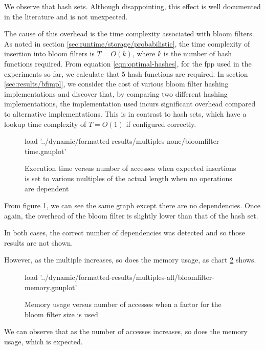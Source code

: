 We observe that hash sets. Although disappointing, this effect is well documented in the literature \citep{Levenberg2007,Dillinger2004} and is not unexpected. 

The cause of this overhead is the time complexity associated with bloom filters. As noted in section \ref{sec:runtime/storage/probabilistic}, the time complexity of insertion into bloom filters is $T=O(k)$, where $k$ is the number of hash functions required. From equation \ref{eqn:optimal-hashes}, for the fpp used in the experiments so far, we calculate that 5 hash functions are required. In section \ref{sec:results/bfimpl}, we consider the cost of various bloom filter hashing implementations and discover that, by comparing two different hashing implementations, the implementation used incurs significant overhead compared to alternative implementations. This is in contrast to hash sets, which have a lookup time complexity of $T=O(1)$ if configured correctly.

\begin{figure}
	\centering
	\begin{gnuplot}[terminal=pdf]
	load '../dynamic/formatted-results/multiples-none/bloomfilter-time.gnuplot'
	\end{gnuplot}
	\caption{Execution time versus number of accesses when expected insertions is set to various multiples of the actual length when no operations are dependent}
	\label{chart:multiples-none}
\end{figure}

From figure \ref{chart:multiples-none}, we can see the same graph except there are no dependencies. Once again, the overhead of the bloom filter is slightly lower than that of the hash set.

In both cases, the correct number of dependencies was detected and so those results are not shown.

However, as the multiple increases, so does the memory usage, as chart \ref{chart:multiples-memory} shows.

\begin{figure}
	\centering
	\begin{gnuplot}[terminal=pdf]
	load '../dynamic/formatted-results/multiples-all/bloomfilter-memory.gnuplot'
	\end{gnuplot}
	\caption{Memory usage versus number of accesses when a factor for the bloom filter size is used}
	\label{chart:multiples-memory}
\end{figure}

We can observe that as the number of accesses increases, so does the memory usage, which is expected.


